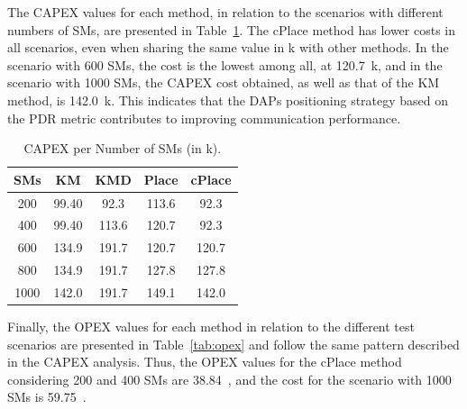 \documentclass[a4paper,fleqn]{cas-dc}
\begin{document}
The \gls{CAPEX} values for each method, in relation to the scenarios with different numbers of \gls{SMs}, are presented in Table~\ref{tab:capex}. The cPlace method has lower costs in all scenarios, even when sharing the same value in k\EUR{} with other methods. In the scenario with 600 \gls{SMs}, the cost is the lowest among all, at 120.7~k\EUR{}, and in the scenario with 1000 \gls{SMs}, the \gls{CAPEX} cost obtained, as well as that of the KM method, is 142.0~k\EUR{}. This indicates that the \gls{DAPs} positioning strategy based on the \gls{PDR} metric contributes to improving communication performance.

\begin{table}[ht]
    \centering
    \caption{\gls{CAPEX} per Number of \gls{SMs} (in k\EUR{}).}
    \begin{tabular}{ccccc}
        \hline \hline
        \gls{SMs} &  KM & KMD & Place & cPlace \\ \hline
        200      &  99.40 &  92.3 & 113.6 & 92.3 \\
        400      &  99.40 &  113.6 & 120.7 & 92.3 \\
        600      &  134.9 &  191.7 & 120.7 & 120.7 \\ 
        800      &  134.9 &  191.7 & 127.8 & 127.8 \\ 
        1000     &  142.0 &  191.7 &  149.1 & 142.0 \\ \hline \hline
    \end{tabular}
    \label{tab:capex}
\end{table}

Finally, the \gls{OPEX} values for each method in relation to the different test scenarios are presented in Table~\ref{tab:opex} and follow the same pattern described in the \gls{CAPEX} analysis. Thus, the \gls{OPEX} values for the cPlace method considering 200 and 400 \gls{SMs} are 38.84~, and the cost for the scenario with 1000 \gls{SMs} is 59.75~.
\end{document}

